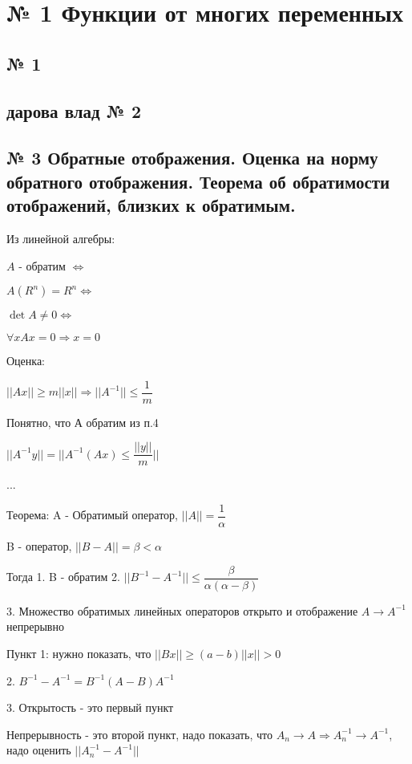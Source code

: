 \documentclass{article}
\begin{document}
\footnotesize

\section{№ 1 Функции от многих переменных}

\subsection{ \footnotesize  № 1}

\subsection{ \footnotesize дарова влад № 2}

\subsection{ \footnotesize № 3 Обратные отображения. Оценка на норму обратного отображения. Теорема об обратимости отображений, близких к обратимым.}

Из линейной алгебры:

$A$ - обратим $\Leftrightarrow$

$A(R^n) = R^n \Leftrightarrow$

$\det A \neq 0 \Leftrightarrow$

$\forall x Ax = 0 \Rightarrow x = 0$

Оценка:

$||Ax|| \geq m||x|| \Rightarrow ||A^{-1}|| \leq \dfrac{1}{m}$

Понятно, что А обратим из п.4

$||A^{-1}y|| = ||A^{-1}(Ax) \leq \dfrac{||y||}{m}||$

...

Теорема: A - Обратимый оператор, $||A|| = \dfrac{1}{\alpha}$

B - оператор, $||B - A|| = \beta < \alpha$

Тогда 1. B - обратим 2. $||B^{-1} - A^{-1}|| \leq \dfrac{\beta}{\alpha(\alpha - \beta)}$

3. Множество обратимых линейных операторов открыто и отображение $A \rightarrow A^{-1}$ непрерывно

Пункт 1: нужно показать, что $||Bx|| \geq (a - b)||x|| > 0$

2. $B^{-1} - A^{-1} = B^{-1}(A - B)A^{-1}$

3. Открытость - это первый пункт

Непрерывность - это второй пункт, надо показать, что $A_n \rightarrow A \Rightarrow A_n^{-1} \rightarrow A^{-1}$, надо оценить $||A_n^{-1} - A^{-1}||$
\end{document}
